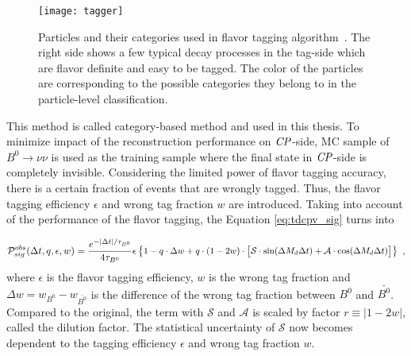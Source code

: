 \begin{figure}[H]
\centering
\texttt{[image: tagger]}
\caption{Particles and their categories used in flavor tagging algorithm~\cite{abudinen2020first}. The right side shows a few typical decay processes in the tag-side which are flavor definite and easy to be tagged. The color of the particles are corresponding to the possible categories they belong to in the particle-level classification.}
\label{fig:flavortagger}
\end{figure}
 

This method is called category-based method and used in this thesis. To minimize impact of the reconstruction performance on $\it{CP}$-side, MC sample of $B^0 \to \nu \nu$ is used as the training sample where the final state in $\it{CP}$-side is completely invisible. 
Considering the limited power of flavor tagging accuracy, there is a certain fraction of events that are wrongly tagged. Thus, the flavor tagging efficiency $\epsilon$ and wrong tag fraction $w$ are introduced. Taking into account of the performance of the flavor tagging, the Equation \ref{eq:tdcpv_sig} turns into %

\begin{equation}\label{eq:tdcpv_all_ft}
\small
\mathcal{P}_{sig}^{obs}(\Delta t, q, \epsilon, w) = 
\frac{e^{-|\Delta t|/\tau_{B^0}}}{4\tau_{B^0}}
\epsilon
\begin{Bmatrix}
1 - q\cdot \Delta w+ q\cdot(1-2w)\cdot 
\begin{bmatrix}
\mathcal{S}\cdot\text{sin}(\Delta M_d \Delta t) + 
\mathcal{A}\cdot\text{cos}(\Delta M_d \Delta t)
\end{bmatrix}
\end{Bmatrix}~,
\end{equation} 
where $\epsilon$ is the flavor tagging efficiency, $w$ is the wrong tag fraction and $\Delta w = w_{B^0}-w_{\bar{B^0}}$ is the difference of the wrong tag fraction between $B^0$ and $\bar{B^0}$.
Compared to the original, the term with $\mathcal{S}$ and $\mathcal{A}$ is scaled by factor $r\equiv |1-2w|$, called  the dilution factor. The statistical uncertainty of $\mathcal{S}$ now becomes dependent to the tagging efficiency $\epsilon$ and wrong tag fraction $w$. 

